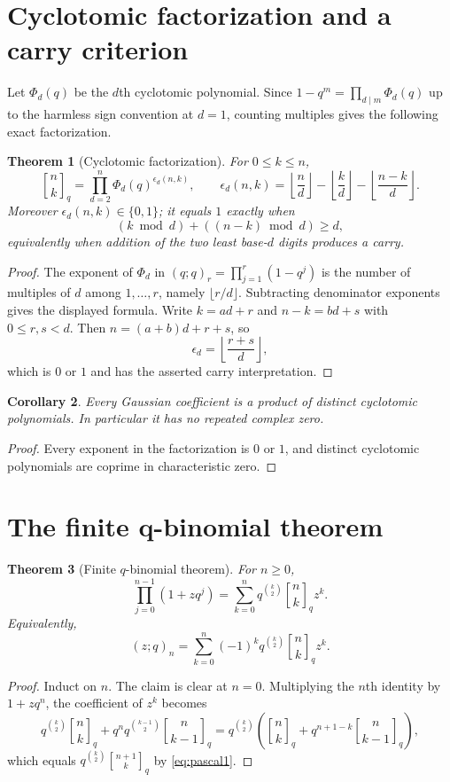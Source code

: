 \documentclass[11pt]{article}
\numberwithin{equation}{section}
\newtheorem{theorem}{Theorem}[section]
\newtheorem{corollary}[theorem]{Corollary}
\theoremstyle{definition}
\newcommand{\qbinom}[2]{\genfrac{[}{]}{0pt}{}{#1}{#2}_{q}}
\begin{document}
\section{Cyclotomic factorization and a carry criterion}
Let $\Phi_d(q)$ be the $d$th cyclotomic polynomial.  Since $1-q^m=\prod_{d\mid m}\Phi_d(q)$ up to the harmless sign convention at $d=1$, counting multiples gives the following exact factorization.

\begin{theorem}[Cyclotomic factorization]
For $0\le k\le n$,
\[
\qbinom nk=\prod_{d=2}^{n}\Phi_d(q)^{\epsilon_d(n,k)},
\qquad
\epsilon_d(n,k)=\left\lfloor\frac nd\right\rfloor-
\left\lfloor\frac kd\right\rfloor-
\left\lfloor\frac{n-k}d\right\rfloor.
\]
Moreover $\epsilon_d(n,k)\in\{0,1\}$; it equals $1$ exactly when
\[
(k\bmod d)+((n-k)\bmod d)\ge d,
\]
equivalently when addition of the two least base-$d$ digits produces a carry.
\end{theorem}
\begin{proof}
The exponent of $\Phi_d$ in $(q;q)_r=\prod_{j=1}^r(1-q^j)$ is the number of multiples of $d$ among $1,\ldots,r$, namely $\lfloor r/d\rfloor$.  Subtracting denominator exponents gives the displayed formula.  Write $k=ad+r$ and $n-k=bd+s$ with $0\le r,s<d$.  Then $n=(a+b)d+r+s$, so
\[
\epsilon_d=\left\lfloor\frac{r+s}{d}\right\rfloor,
\]
which is $0$ or $1$ and has the asserted carry interpretation.
\end{proof}

\begin{corollary}
Every Gaussian coefficient is a product of distinct cyclotomic polynomials.  In particular it has no repeated complex zero.
\end{corollary}
\begin{proof}
Every exponent in the factorization is $0$ or $1$, and distinct cyclotomic polynomials are coprime in characteristic zero.
\end{proof}

\section{The finite q-binomial theorem}
\begin{theorem}[Finite $q$-binomial theorem]
For $n\ge0$,
\begin{equation}
\prod_{j=0}^{n-1}(1+zq^j)
=\sum_{k=0}^{n}q^{\binom k2}\qbinom nk z^k.\label{eq:fqbt}
\end{equation}
Equivalently,
\[
(z;q)_n=\sum_{k=0}^n(-1)^kq^{\binom k2}\qbinom nk z^k.
\]
\end{theorem}
\begin{proof}
Induct on $n$.  The claim is clear at $n=0$.  Multiplying the $n$th identity by $1+zq^n$, the coefficient of $z^k$ becomes
\[
q^{\binom k2}\qbinom nk+q^nq^{\binom{k-1}2}\qbinom n{k-1}
=q^{\binom k2}\left(\qbinom nk+q^{n+1-k}\qbinom n{k-1}\right),
\]
which equals $q^{\binom k2}\qbinom{n+1}k$ by \eqref{eq:pascal1}.
\end{proof}
\end{document}
